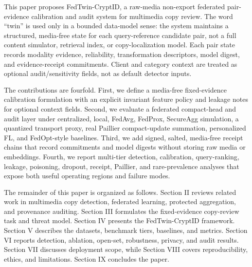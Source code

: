 \documentclass[journal]{IEEEtran}
\newcommand{\ours}{FedTwin-CryptID}
\begin{document}
This paper proposes \ours, a raw-media non-export federated pair-evidence calibration and audit system for multimedia copy review. The word ``twin'' is used only in a bounded data-model sense: the system maintains a structured, media-free state for each query-reference candidate pair, not a full content simulator, retrieval index, or copy-localization model. Each pair state records modality evidence, reliability, transformation descriptors, model digest, and evidence-receipt commitments. Client and category context are treated as optional audit/sensitivity fields, not as default detector inputs.

The contributions are fourfold. First, we define a media-free fixed-evidence calibration formulation with an explicit invariant feature policy and leakage notes for optional context fields. Second, we evaluate a federated compact-head and audit layer under centralized, local, FedAvg, FedProx, SecureAgg simulation, a quantized transport proxy, real Paillier compact-update summation, personalized FL, and FedOpt-style baselines. Third, we add signed, salted, media-free receipt chains that record commitments and model digests without storing raw media or embeddings. Fourth, we report multi-tier detection, calibration, query-ranking, leakage, poisoning, dropout, receipt, Paillier, and rare-prevalence analyses that expose both useful operating regions and failure modes.

The remainder of this paper is organized as follows. Section II reviews related work in multimedia copy detection, federated learning, protected aggregation, and provenance auditing. Section III formulates the fixed-evidence copy-review task and threat model. Section IV presents the FedTwin-CryptID framework. Section V describes the datasets, benchmark tiers, baselines, and metrics. Section VI reports detection, ablation, open-set, robustness, privacy, and audit results. Section VII discusses deployment scope, while Section VIII covers reproducibility, ethics, and limitations. Section IX concludes the paper.
\end{document}
